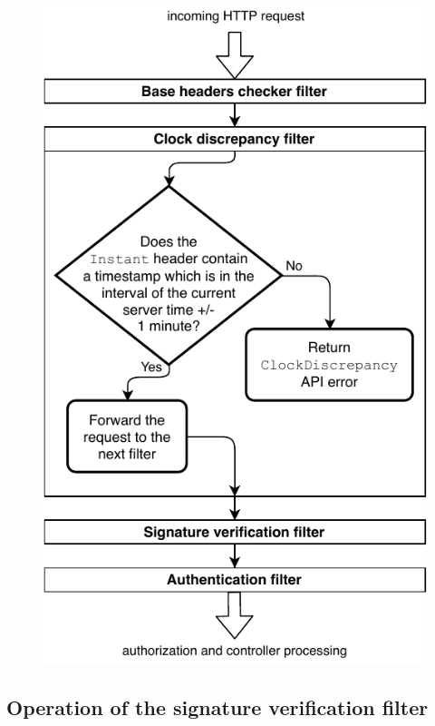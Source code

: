 \begin{figure}[!htb]
    \centering
    \includegraphics[height=\textheight-1cm]{figures/clock-discrepancy-filter.pdf}
\end{figure}

\newpage

\subsection{Operation of the signature verification filter}


